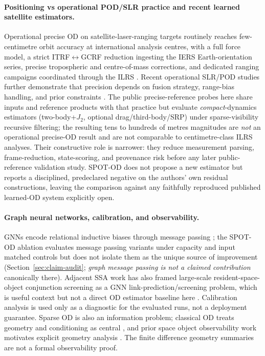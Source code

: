 \documentclass{article}
\begin{document}
\paragraph{Positioning vs operational POD/SLR practice and recent learned satellite estimators.}
Operational precise OD on satellite-laser-ranging targets routinely reaches few-centimetre orbit accuracy at international analysis centres, with a full force model, a strict ITRF$\leftrightarrow$GCRF reduction ingesting the IERS Earth-orientation series, precise tropospheric and centre-of-mass corrections, and dedicated ranging campaigns coordinated through the ILRS \cite{pearlman2002ilrs,ilrs_npt_data,cddis_slr_npt,ilrs_crd_format}. Recent operational SLR/POD studies further demonstrate that precision depends on fusion strategy, range-bias handling, and prior constraints \cite{ren2026slrbds3,lemoine2026std2400}. The public precise-reference probes here share inputs and reference products with that practice but evaluate \emph{compact}-dynamics estimators (two-body+$J_2$, optional drag/third-body/SRP) under sparse-visibility recursive filtering; the resulting tens to hundreds of metres magnitudes are \emph{not} an operational precise-OD result and are not comparable to centimetre-class ILRS analyses. Their constructive role is narrower: they reduce measurement parsing, frame-reduction, state-scoring, and provenance risk before any later public-reference validation study. SPOT-OD does not propose a new estimator but reports a disciplined, predeclared negative on the authors' own residual constructions, leaving the comparison against any faithfully reproduced published learned-OD system explicitly open.

\paragraph{Graph neural networks, calibration, and observability.}
GNNs encode relational inductive biases through message passing \cite{kipf2017,hamilton2017,velickovic2018,battaglia2018relational,gilmer2017neural,scarselli2009graph}; the SPOT-OD ablation evaluates message passing variants under capacity and input matched controls but does not isolate them as the unique source of improvement (Section~\ref{sec:claim-audit}; \emph{graph message passing is not a claimed contribution} canonically there). Adjacent SSA work has also framed large-scale resident-space-object conjunction screening as a GNN link-prediction/screening problem, which is useful context but not a direct OD estimator baseline here \cite{chu2026conjunctiongnn}. Calibration analysis \cite{guo2017calibration} is used only as a diagnostic for the evaluated runs, not a deployment guarantee. Sparse OD is also an information problem; classical OD treats geometry and conditioning as central \cite{tapley2004statistical}, and prior space object observability work motivates explicit geometry analysis \cite{friedman2018space}. The finite difference geometry summaries are not a formal observability proof.
\end{document}

